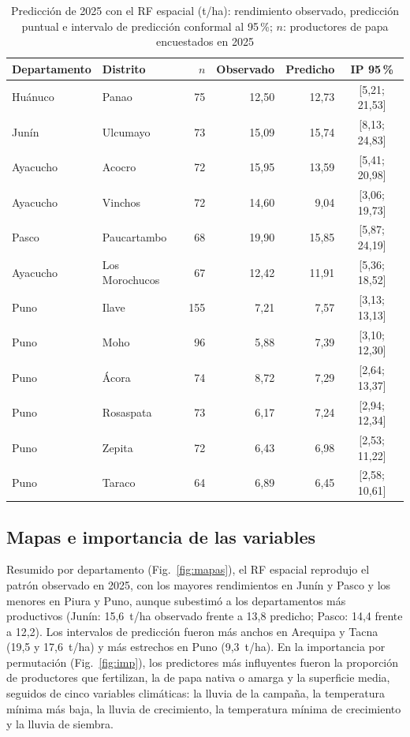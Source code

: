 \documentclass[conference,letterpaper]{IEEEtran}
\begin{document}
\begin{table}[!t]
\caption{Predicción de 2025 con el RF espacial (t/ha): rendimiento observado, predicción puntual e intervalo de predicción conformal al 95\,\%; $n$: productores de papa encuestados en 2025}
\label{tab:pred}
\centering
\footnotesize
\setlength{\tabcolsep}{2.4pt}
\begin{tabular}{llrrrc}
\toprule
Departamento & Distrito & $n$ & Observado & Predicho & IP 95\,\% \\
\midrule
Huánuco & Panao & 75 & 12,50 & 12,73 & [5,21; 21,53] \\
Junín & Ulcumayo & 73 & 15,09 & 15,74 & [8,13; 24,83] \\
Ayacucho & Acocro & 72 & 15,95 & 13,59 & [5,41; 20,98] \\
Ayacucho & Vinchos & 72 & 14,60 & 9,04 & [3,06; 19,73] \\
Pasco & Paucartambo & 68 & 19,90 & 15,85 & [5,87; 24,19] \\
Ayacucho & Los Morochucos & 67 & 12,42 & 11,91 & [5,36; 18,52] \\
\midrule
Puno & Ilave & 155 & 7,21 & 7,57 & [3,13; 13,13] \\
Puno & Moho & 96 & 5,88 & 7,39 & [3,10; 12,30] \\
Puno & Ácora & 74 & 8,72 & 7,29 & [2,64; 13,37] \\
Puno & Rosaspata & 73 & 6,17 & 7,24 & [2,94; 12,34] \\
Puno & Zepita & 72 & 6,43 & 6,98 & [2,53; 11,22] \\
Puno & Taraco & 64 & 6,89 & 6,45 & [2,58; 10,61] \\
\bottomrule
\end{tabular}
\end{table}

\subsection{Mapas e importancia de las variables}
Resumido por departamento (Fig.~\ref{fig:mapas}), el RF espacial reprodujo el patrón observado en 2025, con los mayores rendimientos en Junín y Pasco y los menores en Piura y Puno, aunque subestimó a los departamentos más productivos (Junín: 15,6~t/ha observado frente a 13,8 predicho; Pasco: 14,4 frente a 12,2). Los intervalos de predicción fueron más anchos en Arequipa y Tacna (19,5 y 17,6~t/ha) y más estrechos en Puno (9,3~t/ha). En la importancia por permutación (Fig.~\ref{fig:imp}), los predictores más influyentes fueron la proporción de productores que fertilizan, la de papa nativa o amarga y la superficie media, seguidos de cinco variables climáticas: la lluvia de la campaña, la temperatura mínima más baja, la lluvia de crecimiento, la temperatura mínima de crecimiento y la lluvia de siembra.
\end{document}
